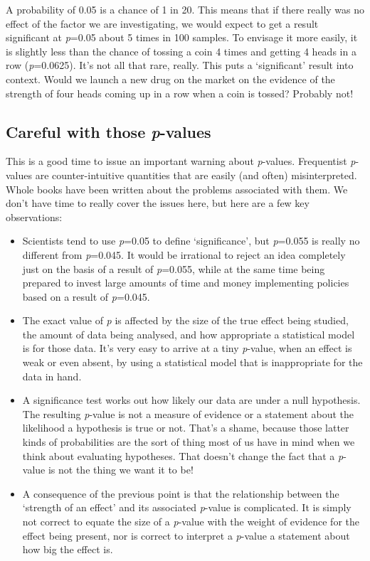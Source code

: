 \documentclass[
]{book}
\begin{document}
A probability of 0.05 is a chance of 1 in 20. This means that if there really was no effect of the factor we are investigating, we would expect to get a result significant at \emph{p}=0.05 about 5 times in 100 samples. To envisage it more easily, it is slightly less than the chance of tossing a coin 4 times and getting 4 heads in a row (\emph{p}=0.0625). It's not all that rare, really. This puts a `significant' result into context. Would we launch a new drug on the market on the evidence of the strength of four heads coming up in a row when a coin is tossed? Probably not!

\hypertarget{careful-with-those-p-values}{%
\subsection{\texorpdfstring{Careful with those \emph{p}-values}{Careful with those p-values}}\label{careful-with-those-p-values}}

This is a good time to issue an important warning about \emph{p}-values. Frequentist \emph{p}-values are counter-intuitive quantities that are easily (and often) misinterpreted. Whole books have been written about the problems associated with them. We don't have time to really cover the issues here, but here are a few key observations:

\begin{itemize}
\item
  Scientists tend to use \emph{p}=0.05 to define `significance', but \emph{p}=0.055 is really no different from \emph{p}=0.045. It would be irrational to reject an idea completely just on the basis of a result of \emph{p}=0.055, while at the same time being prepared to invest large amounts of time and money implementing policies based on a result of \emph{p}=0.045.
\item
  The exact value of \emph{p} is affected by the size of the true effect being studied, the amount of data being analysed, and how appropriate a statistical model is for those data. It's very easy to arrive at a tiny \emph{p}-value, when an effect is weak or even absent, by using a statistical model that is inappropriate for the data in hand.
\item
  A significance test works out how likely our data are under a null hypothesis. The resulting \emph{p}-value is not a measure of evidence or a statement about the likelihood a hypothesis is true or not. That's a shame, because those latter kinds of probabilities are the sort of thing most of us have in mind when we think about evaluating hypotheses. That doesn't change the fact that a \emph{p}-value is not the thing we want it to be!
\item
  A consequence of the previous point is that the relationship between the `strength of an effect' and its associated \emph{p}-value is complicated. It is simply not correct to equate the size of a \emph{p}-value with the weight of evidence for the effect being present, nor is correct to interpret a \emph{p}-value a statement about how big the effect is.
\end{itemize}
\end{document}
